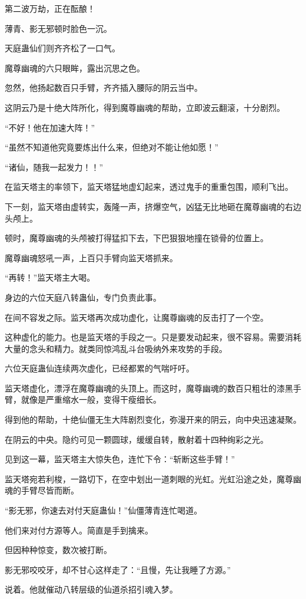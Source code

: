 \begin{this_body}
第二波万劫，正在酝酿！

薄青、影无邪顿时脸色一沉。

天庭蛊仙们则齐齐松了一口气。

魔尊幽魂的六只眼眸，露出沉思之色。

忽然，他扬起数百只手臂，齐齐插入腰际的阴云当中。

这阴云乃是十绝大阵所化，得到魔尊幽魂的帮助，立即波云翻滚，十分剧烈。

“不好！他在加速大阵！”

“虽然不知道他究竟要炼出什么来，但绝对不能让他如愿！”

“诸仙，随我一起发力！！”

在监天塔主的率领下，监天塔猛地虚幻起来，透过鬼手的重重包围，顺利飞出。

下一刻，监天塔由虚转实，轰隆一声，挤爆空气，凶猛无比地砸在魔尊幽魂的右边头颅上。

顿时，魔尊幽魂的头颅被打得猛扣下去，下巴狠狠地撞在锁骨的位置上。

魔尊幽魂怒吼一声，上百只手臂向监天塔抓来。

“再转！”监天塔主大喝。

身边的六位天庭八转蛊仙，专门负责此事。

在间不容发之际。监天塔再次成功虚化，让魔尊幽魂的反击打了一个空。

这种虚化的能力。也是监天塔的手段之一。只是要发动起来，很不容易。需要消耗大量的念头和精力。就类同惊鸿乱斗台吸纳外来攻势的手段。

六位天庭蛊仙连续两次虚化，已经都累的气喘吁吁。

监天塔虚化，漂浮在魔尊幽魂的头顶上。而这时，魔尊幽魂的数百只粗壮的漆黑手臂，就像是严重缩水一般，变得干瘦细长。

得到他的帮助，十绝仙僵无生大阵剧烈变化，弥漫开来的阴云，向中央迅速凝聚。

在阴云的中央。隐约可见一颗圆球，缓缓自转，散射着十四种绚彩之光。

见到这一幕，监天塔主大惊失色，连忙下令：“斩断这些手臂！”

监天塔宛若利梭，一路切下，在空中划出一道刺眼的光虹。光虹沿途之处，魔尊幽魂的手臂尽皆而断。

“影无邪，你速去对付天庭蛊仙！”仙僵薄青连忙喝道。

他们来对付方源等人。简直是手到擒来。

但因种种惊变，数次被打断。

影无邪咬咬牙，却不甘心这样走了：“且慢，先让我睡了方源。”

说着。他就催动八转层级的仙道杀招引魂入梦。


\end{this_body}
